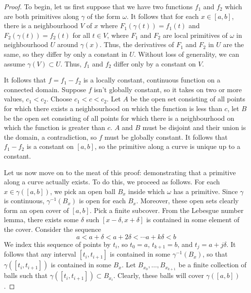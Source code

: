 \documentclass[aps,pra,showpacs,notitlepage,onecolumn,superscriptaddress,nofootinbib]{revtex4-1}
\theoremstyle{definition}
\begin{document}
\begin{proof}
  To begin, let us first suppose that we have two functions $f_1$ and $f_2$ which are both primitives along $\gamma$ of the form $\omega$.
  It follows that for each $x \in [a, b]$, there is a neighbourhood $V$ of $x$ where $F_1(\gamma(t)) = f_1(t)$ and $F_2(\gamma(t)) = f_2(t)$ for all $t \in V$, where
  $F_1$ and $F_2$ are local primitives of $\omega$ in neighbourhood $U$ around $\gamma(x)$. Thus, the derivatives of $F_1$ and $F_2$ in $U$
  are the same, so they differ by only a constant in $U$. Without loss of generality, we can assume $\gamma(V) \subset U$. Thus, $f_1$ and $f_2$ differ only by a constant on $V$.

  It follows that $f = f_1 - f_2$ is a locally constant, continuous function on a connected domain. Suppose $f$ isn't globally constant, so it takes on
  two or more values, $c_1 < c_2$. Choose $c_1 < c < c_2$. Let $A$ be the open set consisting of all points for which there exists a neighbourhood on which the function is less than $c$,
  let $B$ be the open set consisting of all points for which there is a neighbourhood on which the function is greater than $c$. $A$ and $B$ must be disjoint and their union is the domain, a contradiction, so
  $f$ must be globally constant. It follows that $f_1 - f_2$ is a constant on $[a, b]$, so the primitive along a curve is unique up to a constant.
  \newline

  \noindent Let us now move on to the meat of this proof: demonstrating that a primitive along a curve actually exists. To do this, we proceed as follows. For each $x \in \gamma([a, b])$,
  we pick an open ball $B_x$ inside which $\omega$ has a primitive. Since $\gamma$ is continuous, $\gamma^{-1}(B_x)$ is open for each $B_x$. Moreover, these open sets clearly form an open cover
  of $[a, b]$. Pick a finite subcover. From the Lebesgue number lemma, there exists some $\delta$ such $[x - \delta, x + \delta]$ is contained in some element of the cover. Consider the sequence
  \begin{equation}
    a < a + \delta < a + 2 \delta < \cdots a + k \delta < b
  \end{equation}
  We index this sequence of points by $t_i$, so $t_0 = a$, $t_{k + 1} = b$, and $t_j = a + j \delta$. It follows that any interval $[t_{i}, t_{i + 1}]$ is contained in some $\gamma^{-1}(B_x)$, so that
  $\gamma([t_i, t_{i + 1}])$ is contained in some $B_x$. Let $B_{x_0}, \dots, B_{x_{k + 1}}$ be a finite collection of balls such that $\gamma([t_i, t_{i + 1}]) \subset B_{x_i}$. Clearly,
  these balls will cover $\gamma([a, b])$.
  \newline


\end{proof}
\end{document}

